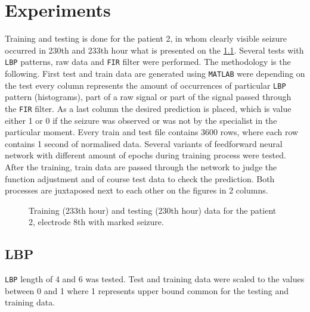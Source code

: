 \chapter{Experiments}
\endgroup
Training and testing is done for the patient 2, in whom clearly visible seizure occurred in 230th and 233th hour what is presented on the \figurename{} \ref{fig:iEEG_230_233_02_8}. Several tests with \verb|LBP| patterns, raw data and \verb|FIR| filter were performed. The methodology is the following. First test and train data are generated using \verb|MATLAB| were depending on the test every column represents the amount of occurrences of particular \verb|LBP| pattern (histograms), part of a raw signal or part of the signal passed through the \verb|FIR| filter. As a last column the desired prediction is placed, which is value either 1 or 0 if the seizure was observed or was not by the specialist in the particular moment. Every train and test file contains 3600 rows, where each row contains 1 second of normalised data. Several variants of feedforward neural network with different amount of epochs during training process were tested. After the training, train data are passed through the network to judge the function adjustment and of course test data to check the prediction. Both processes are juxtaposed next to each other on the figures in 2 columns.

\begin{figure}[H]
	\begin{center}
	\end{center}
	\caption{Training (233th hour) and testing (230th hour) data for the patient 2, electrode 8th with marked seizure.}

	\label{fig:iEEG_230_233_02_8}
\end{figure}

\section{LBP}
\verb|LBP| length of 4 and 6 was tested. Test and training data were scaled to the values between 0 and 1 where 1 represents upper bound common for the testing and training data.

